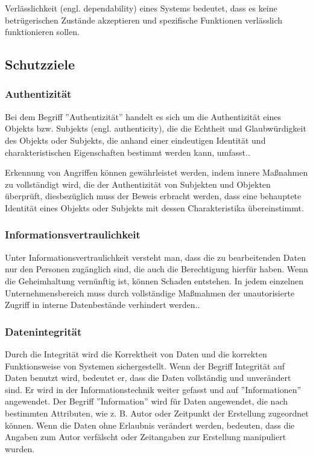 Verlässlichkeit (engl. dependability) eines Systems bedeutet, dass es keine betrügerischen Zustände akzeptieren und spezifische Funktionen verlässlich funktionieren sollen\cite[27]{eckert2013sicherheit}.

\subsection{Schutzziele}

\subsubsection{Authentizität}

Bei dem Begriff ''Authentizität'' handelt es sich um die Authentizität eines Objekts bzw. Subjekts (engl. authenticity), die die Echtheit und Glaubwürdigkeit des Objekts oder Subjekts, die anhand einer eindeutigen Identität und charakteristischen Eigenschaften bestimmt werden kann, umfasst.\cite[28]{eckert2013sicherheit}.

Erkennung von Angriffen können gewährleistet werden, indem innere Maßnahmen zu vollständigt wird, die der Authentizität von Subjekten und Objekten überprüft\cite[13]{spies1985datenschutz}, diesbezüglich muss der Beweis erbracht werden, dass eine behauptete Identität eines Objekts oder Subjekts mit dessen Charakteristika übereinstimmt\cite[28]{eckert2013sicherheit}.

\subsubsection{Informationsvertraulichkeit}
Unter Informationsvertraulichkeit versteht man, dass die zu bearbeitenden Daten nur den Personen zugänglich sind, die auch die Berechtigung hierfür haben. Wenn die Geheimhaltung vernünftig ist, können Schaden entstehen. In jedem einzelnen Unternehmensbereich muss durch vollständige Maßmahmen der unautorisierte Zugriff in interne Datenbestände verhindert werden.\cite[205]{gora2003handbuch}.

\subsubsection{Datenintegrität}

Durch die Integrität wird die Korrektheit von Daten und die korrekten Funktionsweise von Systemen sichergestellt. Wenn der Begriff Integrität auf Daten benutzt wird, bedeutet er, dass die Daten vollständig und unverändert sind. Er wird in der Informationstechnik weiter gefasst und auf ''Informationen'' angewendet. Der Begriff ''Information'' wird für Daten angewendet, die nach bestimmten Attributen, wie z. B. Autor oder Zeitpunkt der Erstellung zugeordnet können. Wenn die Daten ohne Erlaubnis verändert werden, bedeuten, dass die Angaben zum Autor verfälscht oder Zeitangaben zur Erstellung manipuliert wurden\cite{dtint2007}.

